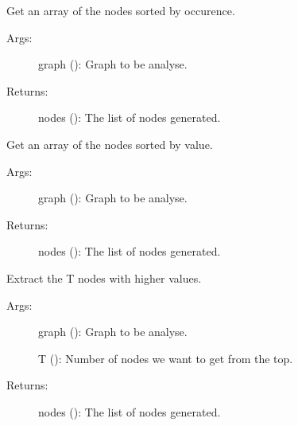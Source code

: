 \documentclass[letterpaper,10pt,english]{sphinxmanual}
\begin{document}

\begin{fulllineitems}
\label{\detokenize{keywords:keywords.Sort_occurences}}
Get an array of the nodes sorted by occurence.
\begin{description}
\item[{Args:}] \leavevmode
graph (): Graph to be analyse.

\item[{Returns:}] \leavevmode
nodes (): The list of nodes generated.

\end{description}

\end{fulllineitems}


\begin{fulllineitems}
\label{\detokenize{keywords:keywords.Sort_values}}
Get an array of the nodes sorted by value.
\begin{description}
\item[{Args:}] \leavevmode
graph (): Graph to be analyse.

\item[{Returns:}] \leavevmode
nodes (): The list of nodes generated.

\end{description}

\end{fulllineitems}


\begin{fulllineitems}
\label{\detokenize{keywords:keywords.Tnodes}}
Extract the T nodes with higher values.
\begin{description}
\item[{Args:}] \leavevmode
graph (): Graph to be analyse.

T (): Number of nodes we want to get from the top.

\item[{Returns:}] \leavevmode
nodes (): The list of nodes generated.

\end{description}

\end{fulllineitems}
\end{document}
